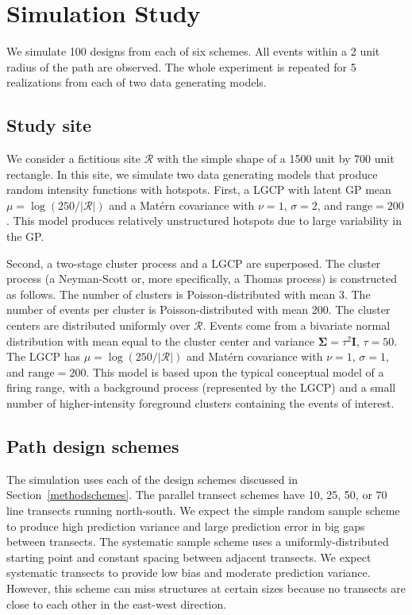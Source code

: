 \documentclass[review]{elsarticle}
\begin{document}
\section{Simulation Study}

We simulate 100 designs from each of six schemes. All events within a 2 unit
radius of the path are observed. The whole experiment is repeated for 5
realizations from each of two data generating models.


\subsection{Study site}

We consider a fictitious site \(\mathcal{R}\) with the simple shape of a 1500
unit by 700 unit rectangle. In this site, we simulate two data generating
models that produce random intensity functions with hotspots. First, a LGCP
with latent GP mean \(\mu = \log(250 / |\mathcal{R}|)\) and a Mat\'{e}rn
covariance with \(\nu = 1\), \(\sigma = 2\), and \(\text{range} = 200\). This
model produces relatively unstructured hotspots due to large variability in the
GP.

Second, a two-stage cluster process and a LGCP are superposed. The cluster
process (a Neyman-Scott or, more specifically, a Thomas process) is constructed
as follows. The number of clusters is Poisson-distributed with mean 3. The
number of events per cluster is Poisson-distributed with mean 200. The cluster
centers are distributed uniformly over \(\mathcal{R}\). Events come from a
bivariate normal distribution with mean equal to the cluster center and
variance \(\boldsymbol{\Sigma} = \tau^{2}\mathbf{I}\), \(\tau = 50\). The LGCP
has \(\mu = \log(250 / |\mathcal{R}|)\) and Mat\'{e}rn covariance with
\(\nu = 1\), \(\sigma = 1\), and \(\text{range} = 200\). This model is based
upon the typical conceptual model of a firing range, with a background process
(represented by the LGCP) and a small number of higher-intensity foreground
clusters containing the events of interest.


\subsection{Path design schemes}

The simulation uses each of the design schemes discussed in
Section~\ref{methodschemes}. The parallel transect schemes have 10,
25, 50, or 70 line transects running north-south. We expect the
simple random sample scheme to produce high prediction variance and large
prediction error in big gaps between transects. The systematic sample scheme
uses a uniformly-distributed starting point and constant spacing between
adjacent transects. We expect systematic transects to provide low bias and
moderate prediction variance. However, this scheme can miss structures at
certain sizes because no transects are close to each other in the east-west
direction.
\end{document}
